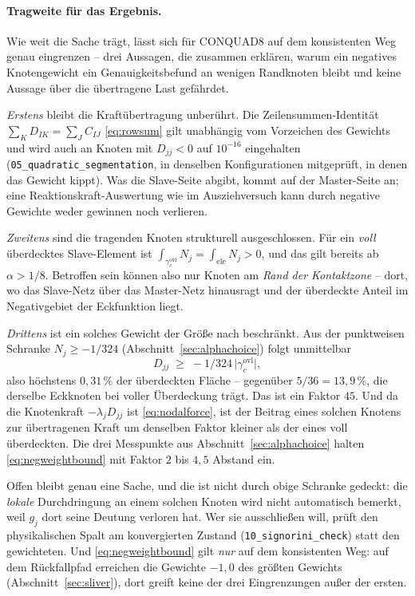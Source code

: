 \documentclass[a4paper,11pt]{article}
\def\tfrac#1#2{#1/#2}%
\def\tilde#1{#1}%
\newcommand{\file}[1]{\texttt{\small #1}}
\begin{document}
\paragraph{Tragweite für das Ergebnis.}
Wie weit die Sache trägt, lässt sich für CONQUAD8 auf dem konsistenten Weg genau eingrenzen -- drei
Aussagen, die zusammen erklären, warum ein negatives Knotengewicht ein Genauigkeitsbefund an
wenigen Randknoten bleibt und keine Aussage über die übertragene Last gefährdet.

\emph{Erstens} bleibt die Kraftübertragung unberührt. Die Zeilensummen-Identität
$\sum_K D_{IK}=\sum_J C_{IJ}$ \eqref{eq:rowsum} gilt unabhängig vom Vorzeichen des Gewichts und
wird auch an Knoten mit $\tilde D_{jj}<0$ auf $10^{-16}$ eingehalten
(\file{05\_quadratic\_segmentation}, in denselben Konfigurationen mitgeprüft, in denen das Gewicht
kippt). Was die Slave-Seite abgibt, kommt auf der Master-Seite an; eine Reaktionskraft-Auswertung
wie im Ausziehversuch kann durch negative Gewichte weder gewinnen noch verlieren.

\emph{Zweitens} sind die tragenden Knoten strukturell ausgeschlossen. Für ein \emph{voll}
überdecktes Slave-Element ist $\int_{\gamma_c^{\text{ovl}}}\tilde N_j=\int_{\text{ele}}\tilde N_j>0$,
und das gilt bereits ab $\alpha>\tfrac18$. Betroffen sein können also nur Knoten am \emph{Rand der
Kontaktzone} -- dort, wo das Slave-Netz über das Master-Netz hinausragt und der überdeckte Anteil
im Negativgebiet der Eckfunktion liegt.

\emph{Drittens} ist ein solches Gewicht der Größe nach beschränkt. Aus der punktweisen Schranke
$\tilde N_j\ge-\tfrac{1}{324}$ (Abschnitt~\ref{sec:alphachoice}) folgt unmittelbar
\begin{equation}
\tilde D_{jj} \;\ge\; -\tfrac{1}{324}\,\big|\gamma_c^{\text{ovl}}\big| ,
\label{eq:negweightbound}
\end{equation}
also höchstens $0{,}31\,\%$ der überdeckten Fläche -- gegenüber $\tfrac{5}{36}=13{,}9\,\%$, die
derselbe Eckknoten bei voller Überdeckung trägt. Das ist ein Faktor $45$. Und da die Knotenkraft
$-\lambda_j\tilde D_{jj}$ ist \eqref{eq:nodalforce}, ist der Beitrag eines solchen Knotens zur
übertragenen Kraft um denselben Faktor kleiner als der eines voll überdeckten. Die drei
Messpunkte aus Abschnitt~\ref{sec:alphachoice} halten \eqref{eq:negweightbound} mit Faktor $2$ bis
$4{,}5$ Abstand ein.

Offen bleibt genau eine Sache, und die ist nicht durch obige Schranke gedeckt: die \emph{lokale}
Durchdringung an einem solchen Knoten wird nicht automatisch bemerkt, weil $\tilde g_j$ dort seine
Deutung verloren hat. Wer sie ausschließen will, prüft den physikalischen Spalt am konvergierten
Zustand (\file{10\_signorini\_check}) statt den gewichteten. Und \eqref{eq:negweightbound} gilt
\emph{nur} auf dem konsistenten Weg: auf dem Rückfallpfad erreichen die Gewichte $-1{,}0$ des
größten Gewichts (Abschnitt~\ref{sec:sliver}), dort greift keine der drei Eingrenzungen außer der
ersten.
\end{document}
